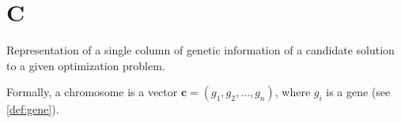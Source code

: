 \section*{C}
  \begin{definition}[Chromosome]
  \label{def:chromosome}
    Representation of a single column of genetic information of a candidate 
    solution to a given optimization problem.

    Formally, a chromosome is a vector \(\textbf{c} = (g_1, g_2, \dots, g_n)\), 
    where \(g_i\) is a gene (see \vref{def:gene}).
  \end{definition}